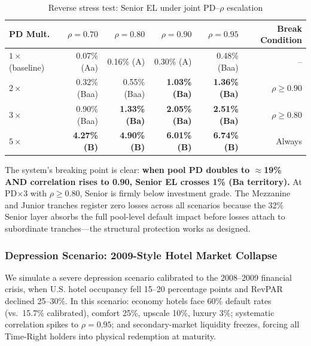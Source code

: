 \documentclass[12pt,a4paper]{article}
\begin{document}
\begin{table}[H]
\centering
\caption{Reverse stress test: Senior EL under joint PD--$\rho$ escalation}
\label{tab:reverse-stress}
\small
\begin{tabular}{@{}lrrrrr@{}}
\toprule
\textbf{PD Mult.} & \textbf{$\rho=0.70$} & \textbf{$\rho=0.80$} & \textbf{$\rho=0.90$} & \textbf{$\rho=0.95$} & \textbf{Break Condition} \\
\midrule
$1\times$ (baseline)  & 0.07\% (Aa)  & 0.16\% (A)   & 0.30\% (A)    & 0.48\% (Baa)  & -- \\
$2\times$             & 0.32\% (Baa) & 0.55\% (Baa) & \textbf{1.03\% (Ba)} & \textbf{1.36\% (Ba)} & $\rho\geq0.90$ \\
$3\times$             & 0.90\% (Baa) & \textbf{1.33\% (Ba)} & \textbf{2.05\% (Ba)} & \textbf{2.51\% (Ba)} & $\rho\geq0.80$ \\
$5\times$             & \textbf{4.27\% (B)} & \textbf{4.90\% (B)} & \textbf{6.01\% (B)} & \textbf{6.74\% (B)} & Always \\
\bottomrule
\end{tabular}
\end{table}

The system's breaking point is clear: \textbf{when pool PD doubles to $\approx$19\% AND correlation rises to 0.90, Senior EL crosses 1\% (Ba territory).}
At PD$\times$3 with $\rho \geq 0.80$, Senior is firmly below investment grade.
The Mezzanine and Junior tranches register zero losses across all scenarios because the 32\% Senior layer absorbs the full pool-level default impact before losses attach to subordinate tranches---the structural protection works as designed.

\subsubsection{Depression Scenario: 2009-Style Hotel Market Collapse}

We simulate a severe depression scenario calibrated to the 2008--2009 financial crisis, when U.S. hotel occupancy fell 15--20 percentage points and RevPAR declined 25--30\%.
In this scenario: economy hotels face 60\% default rates (vs.\ 15.7\% calibrated), comfort 25\%, upscale 10\%, luxury 3\%; systematic correlation spikes to $\rho = 0.95$; and secondary-market liquidity freezes, forcing all Time-Right holders into physical redemption at maturity.
\end{document}
